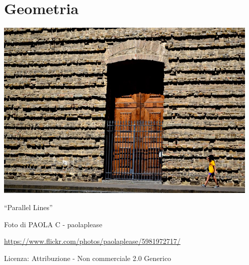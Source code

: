 \part{Geometria}

\includegraphics[width=0.95\textwidth]{img/parallel.jpg}
  \begin{center}
    {\large ``Parallel Lines''}\par
    Foto di PAOLA C - paolaplease\par
    \url{https://www.flickr.com/photos/paolaplease/5981972717/}\par
    Licenza: Attribuzione - Non commerciale 2.0 Generico\par
  \end{center}
\clearpage
\cleardoublepage
